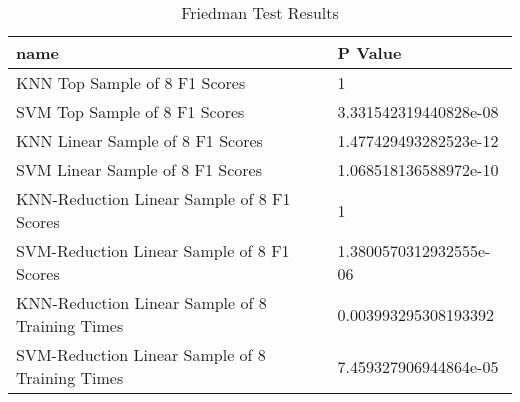 \begin{table}
\centering
\caption{Friedman Test Results}
\label{tab:friedman_test_results_mushroom}
\begin{tabular}{ll}
\toprule
name & P Value \\
\midrule
KNN Top Sample of 8 F1 Scores & 1 \\
SVM Top Sample of 8 F1 Scores & 3.331542319440828e-08 \\
KNN Linear Sample of 8 F1 Scores & 1.477429493282523e-12 \\
SVM Linear Sample of 8 F1 Scores & 1.068518136588972e-10 \\
KNN-Reduction Linear Sample of 8 F1 Scores & 1 \\
SVM-Reduction Linear Sample of 8 F1 Scores & 1.3800570312932555e-06 \\
KNN-Reduction Linear Sample of 8 Training Times & 0.003993295308193392 \\
SVM-Reduction Linear Sample of 8 Training Times & 7.459327906944864e-05 \\
\bottomrule
\end{tabular}
\end{table}
